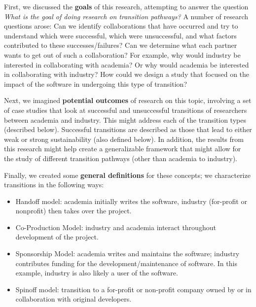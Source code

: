 First, we discussed the \textbf{goals} of this research, attempting to answer the 
question \emph{What is the goal of doing research on transition pathways?}
A number of research questions arose:  Can we identify collaborations that have 
occurred and try to understand which were successful, which were unsuccessful, 
and what factors contributed to these successes/failures? Can we determine what 
each partner wants to get out of such a collaboration? For example, why would 
industry be interested in collaborating with academia? Or why would academia 
be interested in collaborating with industry? How could we design a study that 
focused on the impact of the software in undergoing this type of transition?

Next, we imagined \textbf{potential outcomes} of research on this topic, involving 
a set of case studies that look at successful and unsuccessful
transitions of researchers between academia and industry. This might address 
each of the transition types (described below). Successful transitions are
described as those that lead to either weak or strong sustainability (also
defined below). In addition, the results from this research might help create a 
generalizable framework that might allow for the study of different transition 
pathways (other than academia to industry).

Finally, we created some \textbf{general definitions} for these concepts; we 
characterize transitions in the following ways:
\begin{itemize}

\item Handoff model: academia initially writes the software, industry (for-profit 
or nonprofit) then takes over the project.

\item Co-Production Model: industry and academia interact throughout development
of the project.

\item Sponsorship Model: academia writes and maintains the software; 
industry contributes funding for the development\slash maintenance of software.
In this example, industry is also likely a user of the software.

\item Spinoff model: transition to a for-profit or non-profit company owned by or in
collaboration with original developers.

\end{itemize}

